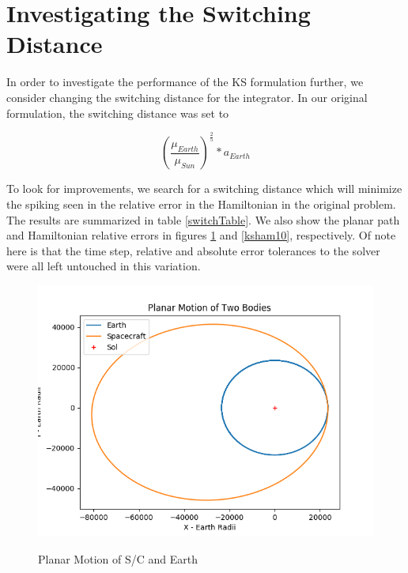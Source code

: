 \documentclass[11pt,twoside,letterpaper]{article}
\begin{document}
  \section{Investigating the Switching Distance}
  In order to investigate the performance of the KS formulation
  further, we consider changing the switching distance for the
  integrator. In our original formulation, the switching distance was
  set to
  
  \begin{equation}
    \left(\frac{\mu_{Earth}}{\mu_{Sun}}\right)^{\frac{2}{5}}*a_{Earth}
  \end{equation}
  
  To look for improvements, we search for a switching distance which
  will minimize the spiking seen in the relative error in the
  Hamiltonian in the original problem. The results are summarized in
  table \ref{switchTable}. We also show the planar path and
  Hamiltonian relative errors in figures \ref{kspath10} and
  \ref{ksham10}, respectively. Of note here is that the time step,
  relative and absolute error tolerances to the solver were all left
  untouched in this variation. 

  \begin{figure}
    \caption{Planar Motion of S/C and Earth}
    \centering
    \includegraphics[width=\textwidth]{PlanarPath}
    \label{kspath10}
  \end{figure}
\end{document}
